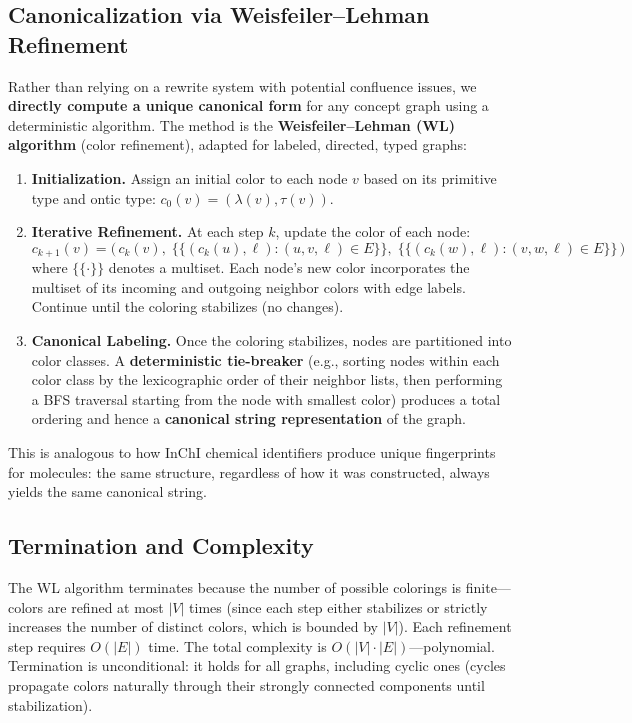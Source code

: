 \documentclass[12pt, letterpaper]{book}
\begin{document}
\subsection{Canonicalization via Weisfeiler--Lehman Refinement}

Rather than relying on a rewrite system with potential confluence issues, we \textbf{directly compute a unique canonical form} for any concept graph using a deterministic algorithm. The method is the \textbf{Weisfeiler--Lehman (WL) algorithm} (color refinement), adapted for labeled, directed, typed graphs:

\begin{enumerate}[label=\textbf{Step \arabic*:}]
    \item \textbf{Initialization.} Assign an initial color to each node $v$ based on its primitive type and ontic type: $c_0(v) = (\lambda(v), \tau(v))$.
    \item \textbf{Iterative Refinement.} At each step $k$, update the color of each node:
    \[
    c_{k+1}(v) = \bigl(\, c_k(v),\; \{\!\!\{ (c_k(u), \ell) : (u, v, \ell) \in E \}\!\!\},\; \{\!\!\{ (c_k(w), \ell) : (v, w, \ell) \in E \}\!\!\} \,\bigr)
    \]
    where $\{\!\!\{\cdot\}\!\!\}$ denotes a multiset. Each node's new color incorporates the multiset of its incoming and outgoing neighbor colors with edge labels. Continue until the coloring stabilizes (no changes).
    \item \textbf{Canonical Labeling.} Once the coloring stabilizes, nodes are partitioned into color classes. A \textbf{deterministic tie-breaker} (e.g., sorting nodes within each color class by the lexicographic order of their neighbor lists, then performing a BFS traversal starting from the node with smallest color) produces a total ordering and hence a \textbf{canonical string representation} of the graph.
\end{enumerate}

This is analogous to how InChI chemical identifiers produce unique fingerprints for molecules: the same structure, regardless of how it was constructed, always yields the same canonical string.

\subsection{Termination and Complexity}

The WL algorithm terminates because the number of possible colorings is finite---colors are refined at most $|V|$ times (since each step either stabilizes or strictly increases the number of distinct colors, which is bounded by $|V|$). Each refinement step requires $O(|E|)$ time. The total complexity is $O(|V| \cdot |E|)$---polynomial. Termination is unconditional: it holds for all graphs, including cyclic ones (cycles propagate colors naturally through their strongly connected components until stabilization).
\end{document}
